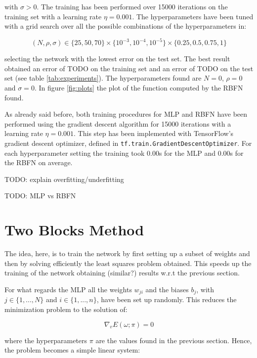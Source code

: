 \documentclass[a4paper]{article}
\numberwithin{equation}{section} %
\numberwithin{figure}{section} %
\numberwithin{table}{section} %
\theoremstyle{definition}
\begin{document}
\noindent with $\sigma > 0$.
The training has been performed over 15000 iterations on the training set with
a learning rate $\eta = 0.001$. The hyperparameters have been tuned with a
grid search over all the possible combinations of the hyperparameters in:

\[ (N, \rho, \sigma) \in \Big\{25, 50, 70\Big\} \times \Big\{10^{-3}, 10^{-4}, 10^{-5}\Big\}
\times \Big\{0.25, 0.5, 0.75, 1\Big\} \]

\noindent selecting the network with the lowest error on the test set.
The best result obtained an error of TODO on the training set and an error of
TODO on the test set (see table \ref{tab:experiments}).
The hyperparameters found are $N=0$, $\rho=0$ and $\sigma=0$. In figure \ref{fig:plots}
the plot of the function computed by the RBFN found.

As already said before, both training procedures for MLP and RBFN have been
performed using the gradient descent algorithm for 15000 iterations with a
learning rate $\eta = 0.001$. This step has been implemented with TensorFlow's
gradient descent optimizer, defined in \texttt{tf.train.GradientDescentOptimizer}.
For each hyperparameter setting the training took 0.00s for the MLP and 0.00s
for the RBFN on average.

TODO: explain overfitting/underfitting

TODO: MLP vs RBFN


\section{Two Blocks Method}

The idea, here, is to train the network by first setting up a subset of weights
and then by solving efficiently the least squares problem obtained. This
speeds up the training of the network obtaining (similar?) results w.r.t the
previous section.

For what regards the MLP all the weights $w_{ji}$ and the biases $b_j$, with
$j \in \{ 1, ..., N \} $ and $i \in \{ 1, ..., n \} $, have been set up
randomly. This reduces the minimization problem to the solution of:

\begin{equation}
 	\label{eq:min-nabla-v}
	\nabla_v E(\omega; \pi) = 0
\end{equation}

\noindent where the hyperparameters $\pi$ are the values found in the previous
section. Hence, the problem becomes a simple linear system:
\end{document}
